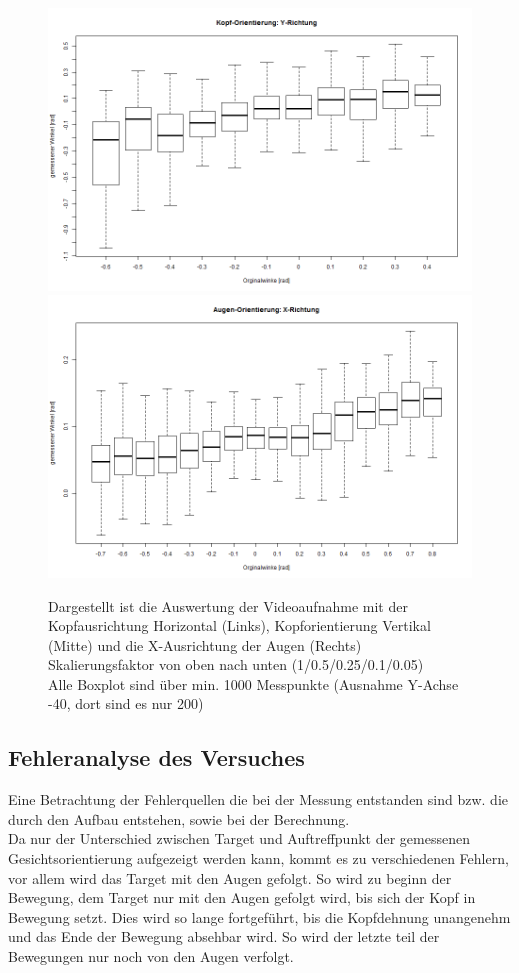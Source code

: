 \begin{figure}
	\includegraphics[width=0.3\linewidth]{OpenFace_Img/Head_y_S005}
	\includegraphics[width=0.3\linewidth]{OpenFace_Img/EyeAVG_x_S005}
	\caption{Dargestellt ist die Auswertung der Videoaufnahme mit der Kopfausrichtung Horizontal (Links), Kopforientierung Vertikal (Mitte) und die X-Ausrichtung der Augen (Rechts)\\Skalierungsfaktor von oben nach unten (1/0.5/0.25/0.1/0.05)\\
	Alle Boxplot sind über min. 1000 Messpunkte (Ausnahme Y-Achse -40, dort sind es nur 200)}
	\label{graph_VideoSkalierung}
\end{figure}
\subsection{Fehleranalyse des Versuches}
Eine Betrachtung der Fehlerquellen die bei der Messung entstanden sind bzw. die durch den Aufbau entstehen, sowie bei der Berechnung.\\
Da nur der Unterschied zwischen Target und Auftreffpunkt der gemessenen Gesichtsorientierung aufgezeigt werden kann, kommt es zu verschiedenen Fehlern, vor allem wird das Target mit den Augen gefolgt.
So wird zu beginn der Bewegung, dem Target nur mit den Augen gefolgt wird, bis sich der Kopf in Bewegung setzt. Dies wird so lange fortgeführt, bis die Kopfdehnung unangenehm und das Ende der Bewegung absehbar wird. So wird der letzte teil der Bewegungen nur noch von den Augen verfolgt.
